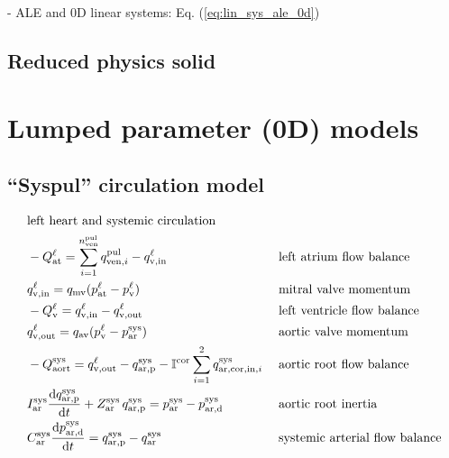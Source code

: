 \documentclass[a4paper,12pt]{report}
\begin{document}
- ALE and 0D linear systems: Eq. (\ref{eq:lin_sys_ale_0d})

\subsection{Reduced physics solid}



\section{Lumped parameter (0D) models}

\subsection{``Syspul'' circulation model}

\begin{alignat}{2}
&\text{left heart and systemic circulation} && \nonumber\\
&-Q_{\mathrm{at}}^{\ell} = \sum\limits_{i=1}^{n_{\mathrm{ven}}^{\mathrm{pul}}}q_{\mathrm{ven},i}^{\mathrm{pul}} - q_{\mathrm{v,in}}^{\ell} && \text{\;left atrium flow balance}\nonumber\\
&q_{\mathrm{v,in}}^{\ell} = q_{\mathrm{mv}}(p_{\mathrm{at}}^{\ell}-p_{\mathrm{v}}^{\ell}) && \text{\;mitral valve momentum}\label{eq:mv_flow}\\
&-Q_{\mathrm{v}}^{\ell} = q_{\mathrm{v,in}}^{\ell} - q_{\mathrm{v,out}}^{\ell} && \text{\;left ventricle flow balance}\nonumber\\
&q_{\mathrm{v,out}}^{\ell} = q_{\mathrm{av}}(p_{\mathrm{v}}^{\ell}-p_{\mathrm{ar}}^{\mathrm{sys}}) && \text{\;aortic valve momentum}\label{eq:av_flow}\\
&-Q_{\mathrm{aort}}^{\mathrm{sys}} = q_{\mathrm{v,out}}^{\ell} - q_{\mathrm{ar,p}}^{\mathrm{sys}} - \mathbb{I}^{\mathrm{cor}}\sum\limits_{i=1}^{2}q_{\mathrm{ar,cor,in},i}^{\mathrm{sys}} && \text{\;aortic root flow balance}\nonumber\\
&I_{\mathrm{ar}}^{\mathrm{sys}} \frac{\mathrm{d}q_{\mathrm{ar,p}}^{\mathrm{sys}}}{\mathrm{d}t} + Z_{\mathrm{ar}}^{\mathrm{sys}}\,q_{\mathrm{ar,p}}^{\mathrm{sys}}=p_{\mathrm{ar}}^{\mathrm{sys}}-p_{\mathrm{ar,d}}^{\mathrm{sys}} && \text{\;aortic root inertia}\nonumber\\
&C_{\mathrm{ar}}^{\mathrm{sys}} \frac{\mathrm{d}p_{\mathrm{ar,d}}^{\mathrm{sys}}}{\mathrm{d}t} = q_{\mathrm{ar,p}}^{\mathrm{sys}} - q_{\mathrm{ar}}^{\mathrm{sys}} && \text{\;systemic arterial flow balance}\nonumber\\

\end{alignat}
\end{document}
